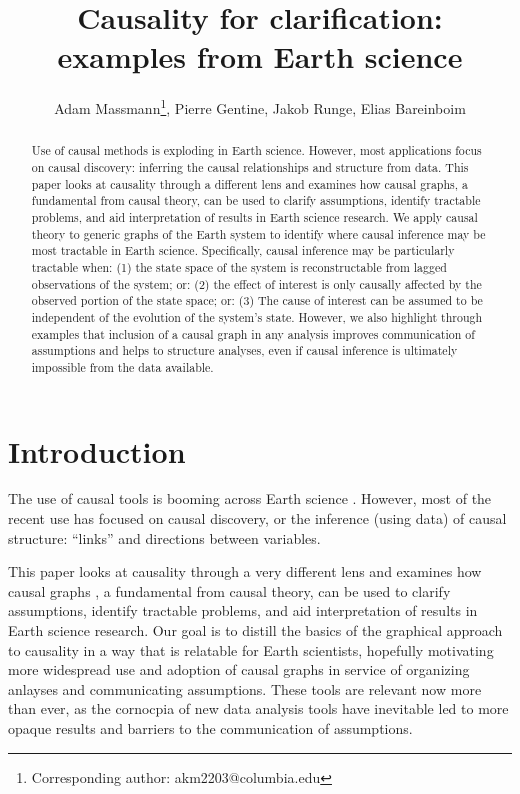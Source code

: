 \documentclass[12pt]{article}
\begin{document}
\title{Causality for clarification: examples from Earth science}

\author{Adam Massmann\thanks{Corresponding author:
    akm2203@columbia.edu}, Pierre Gentine, Jakob Runge, Elias Bareinboim}

\maketitle
\begin{abstract}
  Use of causal methods is exploding in Earth science. However, most
  applications focus on causal discovery: inferring the causal
  relationships and structure from data. This paper looks at causality
  through a different lens and examines how causal graphs, a
  fundamental from causal theory, can be used to clarify assumptions,
  identify tractable problems, and aid interpretation of results in
  Earth science research. We apply causal theory to generic graphs of
  the Earth system to identify where causal inference may be most
  tractable in Earth science. Specifically, causal inference may be
  particularly tractable when: (1) the state space of the system is
  reconstructable from lagged observations of the system; or: (2) the
  effect of interest is only causally affected by the observed portion
  of the state space; or: (3) The cause of interest can be assumed to
  be independent of the evolution of the system’s state. However, we
  also highlight through examples that inclusion of a causal graph in
  any analysis improves communication of assumptions and helps to
  structure analyses, even if causal inference is ultimately
  impossible from the data available.
\end{abstract}

\section{Introduction}

The use of causal tools is booming across Earth science
\citep[e.g.,][]{ebert-uphoff2012,
  samarasinghe-casuality,runge-causal-timeseries,runge2019inferring,goodwell-causality-2020}. However,
most of the recent use has focused on causal discovery, or the
inference (using data) of causal structure: ``links'' and directions
between variables.

This paper looks at causality through a very different lens and
examines how causal graphs \citep{pearl1995causal}, a fundamental from
causal theory, can be used to clarify assumptions, identify tractable
problems, and aid interpretation of results in Earth science
research. Our goal is to distill \citep{olah2017} the basics of the
graphical approach to causality in a way that is relatable for Earth
scientists, hopefully motivating more widespread use and adoption of
causal graphs in service of organizing anlayses and communicating
assumptions. These tools are relevant now more than ever, as the
cornocpia of new data analysis tools have inevitable led to more
opaque results and barriers to the communication of assumptions.
\end{document}
